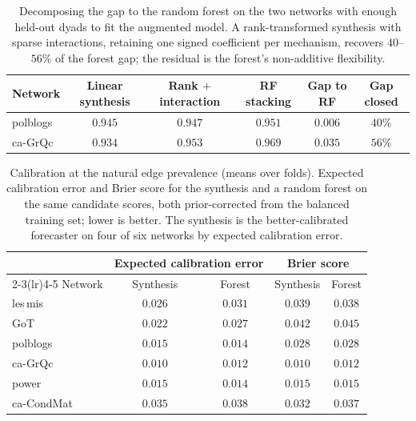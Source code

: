 \documentclass[12pt]{article}
\newcommand{\1}{\mathbf{1}}
\begin{document}
\begin{table}[t]
\centering
\small
\caption{Decomposing the gap to the random forest on the two networks with enough held-out dyads to fit the augmented model. A rank-transformed synthesis with sparse interactions, retaining one signed coefficient per mechanism, recovers $40$--$56\%$ of the forest gap; the residual is the forest's non-additive flexibility.}
\label{tab:gap}
\begin{tabular}{lccccc}
\toprule
Network & Linear synthesis & Rank $+$ interaction & RF stacking & Gap to RF & Gap closed\\
\midrule
\textsf{polblogs} & $0.945$ & $0.947$ & $0.951$ & $0.006$ & $40\%$\\
\textsf{ca-GrQc} & $0.934$ & $0.953$ & $0.969$ & $0.035$ & $56\%$\\
\bottomrule
\end{tabular}
\end{table}

\begin{table}[t]
\centering
\small
\caption{Calibration at the natural edge prevalence (means over folds). Expected calibration error and Brier score for the synthesis and a random forest on the same candidate scores, both prior-corrected from the balanced training set; lower is better. The synthesis is the better-calibrated forecaster on four of six networks by expected calibration error.}
\label{tab:calib}
\begin{tabular}{lcccc}
\toprule
& \multicolumn{2}{c}{Expected calibration error} & \multicolumn{2}{c}{Brier score}\\
\cmidrule(lr){2-3}\cmidrule(lr){4-5}
Network & Synthesis & Forest & Synthesis & Forest\\
\midrule
\textsf{les\,mis} & $\mathbf{0.026}$ & $0.031$ & $0.039$ & $\mathbf{0.038}$\\
\textsf{GoT} & $\mathbf{0.022}$ & $0.027$ & $\mathbf{0.042}$ & $0.045$\\
\textsf{polblogs} & $0.015$ & $\mathbf{0.014}$ & $0.028$ & $0.028$\\
\textsf{ca-GrQc} & $\mathbf{0.010}$ & $0.012$ & $\mathbf{0.010}$ & $0.012$\\
\textsf{power} & $0.015$ & $\mathbf{0.014}$ & $0.015$ & $0.015$\\
\textsf{ca-CondMat} & $\mathbf{0.035}$ & $0.038$ & $\mathbf{0.032}$ & $0.037$\\
\bottomrule
\end{tabular}
\end{table}
\end{document}
